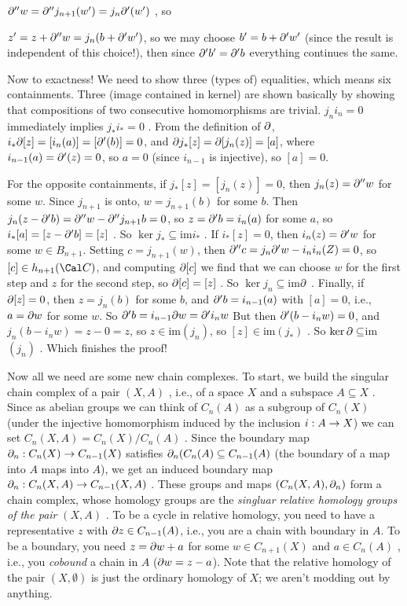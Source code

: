 $\partial^{\prime\prime}w=\partial^{\prime\prime}j_{n+1}(w^\prime) = j_n\partial^\prime(w^\prime)$ ,
so 

$z^\prime= z+\partial^{\prime\prime}w= j_n(b+\partial^\prime w^\prime)$, so we may choose
$b^\prime = b+\partial^\prime w^\prime$ (since the result is independent of this choice!),
then since $\partial^\prime b^\prime = \partial^\prime b$ everything continues the same.

\msk

Now to exactness! We need to show three (types of) equalities, which means six
containments. Three (image contained in kernel) 
are shown basically by showing that compositions of
two consecutive homomorphisms are trivial. $j_ni_n=0$ 
immediately implies $j_*i_*=0$ . From the definition of $\partial$,
$i_*\partial[z] = [i_n(a)] = [\partial^\prime(b)] = 0$, and 
$\partial j_*[z] = \partial[j_n(z)] = [a]$, where $i_{n-1}(a)=\partial^\prime(z) = 0$,
so $a=0$ (since $i_{n-1}$ is injective), so $[a]=0$. 

\ssk

For the opposite containments,
if $j_*[z]=[j_n(z)]=0$, then $j_n(z)=\partial^{\prime\prime}w$ for some $w$. 
Since $j_{n+1}$ is onto, $w=j_{n+1}(b)$ for some $b$. Then 
$j_n(z-\partial^\prime b) = \partial^{\prime\prime} w-\partial^{\prime\prime} j_{n+1} b = 0$, so 
$z=\partial^\prime b = i_n(a)$ for some $a$, so $i_*[a] = [z-\partial^\prime b] = [z]$ . 
So $\ker j_*\subseteq$im$i_*$ . If $i_*[z]=0$, then $i_n(z)=\partial^\prime w$ for some $w\in B_{n+1}$.
Setting $c=j_{n+1}(w)$, then $\partial^{\prime\prime} c = j_n \partial^\prime w - i_n i_n(Z) = 0$, so 
$[c]\in h_{n+1}({\Cal C})$, and computing $\partial [c]$ we find that we can choose $w$ for the 
first step and $z$ for the second step, so $\partial [c] = [z]$ . So $\ker j_n\subseteq$im$\partial$ .
Finally, if $\partial [z] = 0$, then $z=j_n(b)$ for some $b$, and $\partial^\prime b = i_{n-1}(a)$ with
$[a]=0$, i.e., $a=\partial w$ for some $w$. So $\partial^\prime b = i_{n-1}\partial w = \partial^\prime i_n w$ But
then $\partial^\prime (b-i_n w) = 0$, and 
$j_n(b-i_n w) = z-0 = z$, so $z\in$im$(j_n)$, so $[z]\in$im$(j_*)$ . So 
$\ker\partial\subseteq$im$(j_n)$ . Which finishes the proof!

\msk

Now all we need are some new chain complexes. To start, we build the singular chain complex
of a pair $(X,A)$ , i.e., of a space $X$ and a subspace $A\subseteq X$ .
Since as abelian groups we can think of 
$C_n(A)$ as a subgroup of $C_n(X)$ (under the injective homomorphism induced by the 
inclusion $i:A\rightarrow X$) we can set $C_n(X,A)= C_n(X)/C_n(A)$ . Since the
boundary map $\partial_n:C_n(X)\rightarrow C_{n-1}(X)$ satisfies
$\partial_n(C_n(A)\subseteq C_{n-1}(A)$ (the boundary of a map into $A$ maps into $A$),
we get an induced boundary map $\partial_n:C_n(X,A)\rightarrow C_{n-1}(X,A)$ . These
groups and maps $(C_n(X,A),\partial_n)$ form a chain complex, whose homology groups 
are the {\it singluar relative homology groups of the pair} $(X,A)$ . To be a cycle
in relative homology, you need to have a representative $z$ with $\partial z\in C_{n-1}(A)$,
i.e., you are a chain with boundary in $A$. To be a boundary, you need
$z=\partial w +a$ for some $w\in C_{n+1}(X)$ and $a\in C_n(A)$ , i.e., you {\it cobound}
a chain in $A$ ($\partial w = z-a$). Note that the relative homology of the pair $(X,\emptyset)$
is just the ordinary homology of $X$; we aren't modding out by anything.

